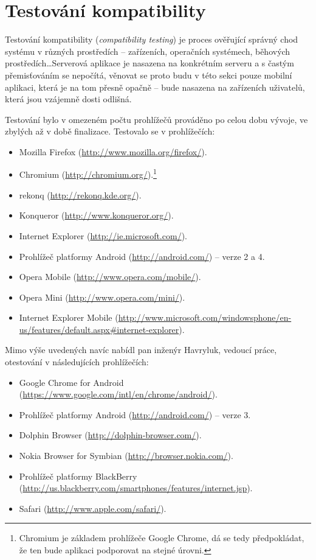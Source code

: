 \section{Testování kompatibility}
\label{sec:test:compat}
Testování kompatibility (\textit{compatibility testing}) je proces ověřující správný chod systému v různých prostředích -- zařízeních, operačních systémech, běhových prostředích\dots Serverová aplikace je nasazena na konkrétním serveru a s častým přemisťováním se nepočítá, věnovat se proto budu v této sekci pouze mobilní aplikaci, která je na tom přesně opačně -- bude nasazena na zařízeních uživatelů, která jsou vzájemně dosti odlišná.

Testování bylo v omezeném počtu prohlížečů prováděno po celou dobu vývoje, ve zbylých až v době finalizace. Testovalo se v prohlížečích:
\begin{itemize}
 \item Mozilla Firefox (\url{http://www.mozilla.org/firefox/}).
 \item Chromium (\url{http://chromium.org/}).\footnote{Chromium je základem prohlížeče Google Chrome, dá se tedy předpokládat, že ten bude aplikaci podporovat na stejné úrovni.}
 \item rekonq (\url{http://rekonq.kde.org/}).
 \item Konqueror (\url{http://www.konqueror.org/}).
 \item Internet Explorer (\url{http://ie.microsoft.com/}).
 \item Prohlížeč platformy Android (\url{http://android.com/}) -- verze 2 a 4.
 \item Opera Mobile (\url{http://www.opera.com/mobile/}).
 \item Opera Mini (\url{http://www.opera.com/mini/}).
 \item Internet Explorer Mobile (\url{http://www.microsoft.com/windowsphone/en-us/features/default.aspx#internet-explorer}).
\end{itemize}
Mimo výše uvedených navíc nabídl pan inženýr Havryluk, vedoucí práce, otestování v následujících prohlížečích:
\begin{itemize}
 \item Google Chrome for Android (\url{https://www.google.com/intl/en/chrome/android/}).
 \item Prohlížeč platformy Android (\url{http://android.com/}) -- verze 3.
 \item Dolphin Browser (\url{http://dolphin-browser.com/}).
 \item Nokia Browser for Symbian  (\url{http://browser.nokia.com/}).
 \item Prohlížeč platformy BlackBerry (\url{http://us.blackberry.com/smartphones/features/internet.jsp}).
 \item Safari (\url{http://www.apple.com/safari/}).
\end{itemize}

